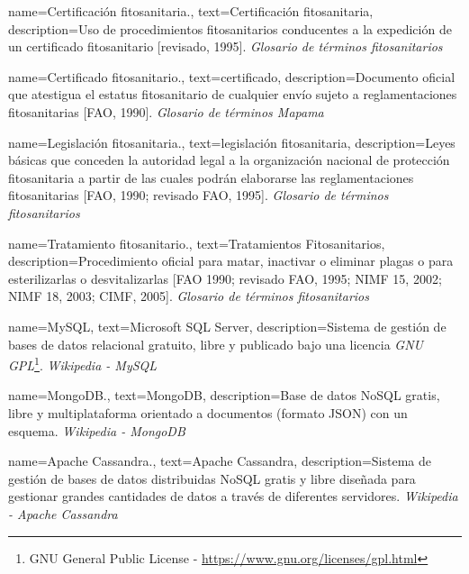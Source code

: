 {
    name={Certificación fitosanitaria.},
    text={Certificación fitosanitaria},
    description={Uso de procedimientos fitosanitarios conducentes a la expedición de un certificado fitosanitario [revisado, 1995]. \textit{Glosario de términos fitosanitarios} \cite{glosarioterminosfito}}
}

{
    name={Certificado fitosanitario.},
    text={certificado},
    description={Documento oficial que atestigua el estatus fitosanitario de cualquier envío sujeto a reglamentaciones fitosanitarias [FAO, 1990]. \textit{Glosario de términos Mapama} \cite{glosarioterminosmapama}}
}

{
    name={Legislación fitosanitaria.},
    text={legislación fitosanitaria},
    description={Leyes básicas que conceden la autoridad legal a la organización nacional de protección fitosanitaria a partir de las cuales podrán elaborarse las reglamentaciones fitosanitarias [FAO, 1990; revisado FAO, 1995]. \textit{Glosario de términos fitosanitarios} \cite{glosarioterminosfito}}
}

{
    name={Tratamiento fitosanitario.},
    text={Tratamientos Fitosanitarios},
    description={Procedimiento oficial para matar, inactivar o eliminar plagas o para esterilizarlas o desvitalizarlas [FAO 1990; revisado FAO, 1995; NIMF 15, 2002; NIMF 18, 2003; CIMF, 2005]. \textit{Glosario de términos fitosanitarios} \cite{glosarioterminosfito}}
}

{
    name={MySQL},
    text={Microsoft SQL Server},
    description={Sistema de gestión de bases de datos relacional gratuito, libre y publicado bajo una licencia \textit{GNU GPL}\footnote{GNU General Public License - \url{https://www.gnu.org/licenses/gpl.html}}. \textit{Wikipedia - MySQL} \cite{wikimysql}}
}

{
    name={MongoDB.},
    text={MongoDB},
    description={Base de datos NoSQL gratis, libre y multiplataforma orientado a documentos (formato JSON) con un esquema. \textit{Wikipedia - MongoDB} \cite{wikimongodb}}
}

{
	name={Apache Cassandra.},
    text={Apache Cassandra},
    description={Sistema de gestión de bases de datos distribuidas NoSQL gratis y libre diseñada para gestionar grandes cantidades de datos a través de diferentes servidores. \textit{Wikipedia - Apache Cassandra} \cite{wikicassandra}}
}

